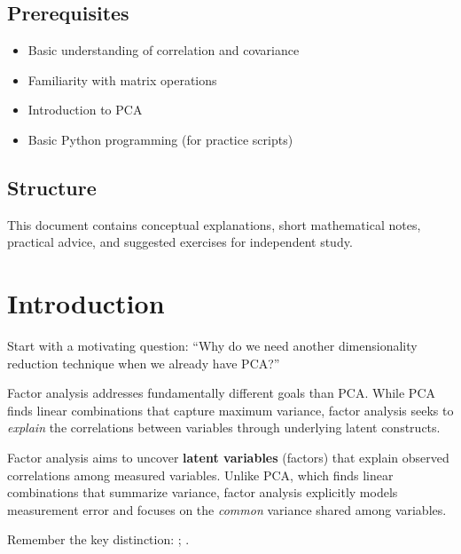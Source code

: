\documentclass[a4paper]{tufte-book}
\begin{document}

\subsection{Prerequisites}
\begin{itemize}
  \item Basic understanding of correlation and covariance
  \item Familiarity with matrix operations
  \item Introduction to PCA
  \item Basic Python programming (for practice scripts)
\end{itemize}

\subsection{Structure}
This document contains conceptual explanations, short mathematical notes, practical advice, and suggested exercises for independent study.

\section{Introduction}

\begin{pedagogicalnote}
Start with a motivating question: ``Why do we need another dimensionality reduction technique when we already have PCA?'' 

Factor analysis addresses fundamentally different goals than PCA. While PCA finds linear combinations that capture maximum variance, factor analysis seeks to \textit{explain} the correlations between variables through underlying latent constructs.
\end{pedagogicalnote}

Factor analysis aims to uncover \textbf{latent variables} (factors) that explain observed correlations among measured variables. Unlike PCA, which finds linear combinations that summarize variance, factor analysis explicitly models measurement error and focuses on the \textit{common} variance shared among variables.

\begin{learningtip}
Remember the key distinction: ; .
\end{learningtip}
\end{document}
